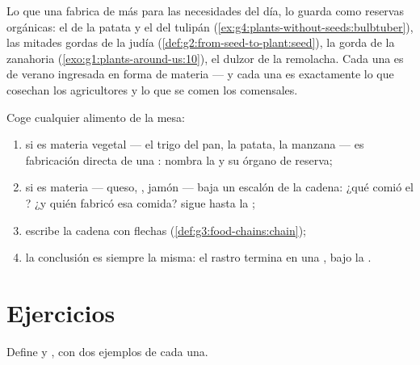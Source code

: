 \begin{example}\label{ex:g6:plants-are-producers:pantry}
Lo que una  fabrica de más para las necesidades del día, lo
guarda como reservas orgánicas: el  de la patata y el 
del tulipán (\cref{ex:g4:plants-without-seeds:bulbtuber}), las mitades
gordas de la judía (\cref{def:g2:from-seed-to-plant:seed}), la 
gorda de la zanahoria (\cref{exo:g1:plants-around-us:10}), el dulzor de
la remolacha. Cada una es  de verano ingresada en forma de materia
--- y cada una es exactamente lo que cosechan los agricultores y lo que
se comen los comensales.
\end{example}

\begin{method}\label{met:g6:plants-are-producers:trace}
Coge cualquier alimento de la mesa:
\begin{enumerate}
  \item si es materia vegetal --- el trigo del pan, la patata, la
        manzana --- es fabricación directa de una : nombra la
         y su órgano de reserva;
  \item si es materia  --- queso, , jamón --- baja un
        escalón de la cadena: ¿qué comió el ? ¿y quién fabricó
        esa comida? sigue hasta la ;
  \item escribe la cadena con flechas
        (\cref{def:g3:food-chains:chain});
  \item la conclusión es siempre la misma: el rastro termina en una
        , bajo la .
\end{enumerate}
\end{method}

\section{Ejercicios}

\begin{exercise}[$\star$]\label{exo:g6:plants-are-producers:1}
Define  y , con dos ejemplos de cada una.
\end{exercise}

